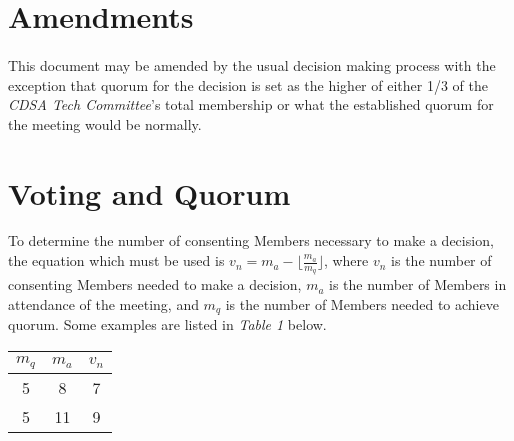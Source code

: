 \documentclass[12pt,letter,twocolumn,oneside,draft]{article}
\newcommand{\cname}{\emph{CDSA Tech Committee}}
\begin{document}
\section{Amendments}

\paragraph{}
This document may be amended by the usual decision making process with the
exception that quorum for the decision is set as the higher of either 1/3 of
the \cname{}'s total membership or what the established quorum for the meeting
would be normally.

\pagebreak

\appendix

\onecolumn
\section{Voting and Quorum}

To determine the number of consenting Members necessary to make a decision, the
equation which must be used is
\( v_{n} = m_{a} - \lfloor \frac{m_{a}}{m_{q}} \rfloor \),
where $v_{n}$ is the number of consenting Members needed to make a decision,
$m_{a}$ is the number of Members in attendance of the meeting, and $m_{q}$ is
the number of Members needed to achieve quorum. Some examples are listed in
\emph{Table 1} below.

 \label{tab:title} 
\begin{tabular}{| c | c | c |}
    \hline
    $m_{q}$ & $m_{a}$ & $v_{n}$ \\
    \hline
    5 & 8 & 7 \\
    \hline
    5 & 11 & 9 \\
    \hline
\end{tabular}
\end{document}
